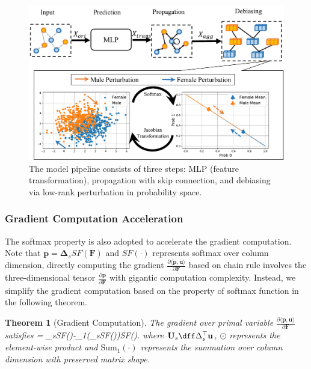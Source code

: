 \documentclass[letterpaper]{article} %
\theoremstyle{plain}
\newtheorem{theorem}{Theorem}[section]
\theoremstyle{definition}
\theoremstyle{remark}
\begin{document}
\begin{figure}[t]
\centering
\includegraphics[width=0.95\linewidth]{fmp_interp.pdf}

\caption{The model pipeline consists of three steps: MLP (feature transformation), propagation with skip connection, and debiasing via low-rank perturbation in probability space. }
\vspace{-5pt}
\label{fig:illu}
\end{figure}



\subsubsection{Gradient Computation Acceleration} 
The softmax property is also adopted to accelerate the gradient computation. Note that $\mathbf{p}=\mathbf{\Delta}_s SF(\mathbf{F})$ and $SF(\cdot)$ represents softmax over column dimension, directly computing the gradient $\frac{\partial \langle \mathbf{p}, \mathbf{u}\rangle}{\partial \mathbf{F}}$ based on chain rule involves the three-dimensional tensor $\frac{\partial \mathbf{p}}{\partial \mathbf{F}}$ with gigantic computation complexity. Instead, we simplify the gradient computation based on the property of softmax function in the following theorem. 

\begin{theorem}[Gradient Computation]\label{theo:grad_comp}
The gradient over primal variable $\frac{\partial \langle \mathbf{p}, \mathbf{u}\rangle}{\partial \mathbf{F}}$ satisfies 
\be 
{}= _s\odot SF()-_{1}(_s\odot SF())SF().
\ee 
where $\mathbf{U}_s\dff \Delta_s^{\top}\mathbf{u}$, $\odot$ represents the element-wise product and $\text{Sum}_{1}(\cdot)$ represents the summation over column dimension with preserved matrix shape. 
\end{theorem}
\end{document}
